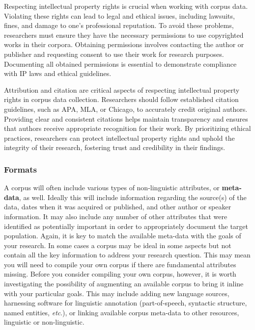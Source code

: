 \documentclass[
  letterpaper,
]{latex/krantz}
\begin{document}
Respecting intellectual property rights is crucial when working with
corpus data. Violating these rights can lead to legal and ethical
issues, including lawsuits, fines, and damage to one's professional
reputation. To avoid these problems, researchers must ensure they have
the necessary permissions to use copyrighted works in their corpora.
Obtaining permissions involves contacting the author or publisher and
requesting consent to use their work for research purposes. Documenting
all obtained permissions is essential to demonstrate compliance with IP
laws and ethical guidelines.

Attribution and citation are critical aspects of respecting intellectual
property rights in corpus data collection. Researchers should follow
established citation guidelines, such as APA, MLA, or Chicago, to
accurately credit original authors. Providing clear and consistent
citations helps maintain transparency and ensures that authors receive
appropriate recognition for their work. By prioritizing ethical
practices, researchers can protect intellectual property rights and
uphold the integrity of their research, fostering trust and credibility
in their findings.

\hypertarget{formats}{%
\subsubsection{Formats}\label{formats}}

A corpus will often include various types of non-linguistic attributes,
or \textbf{meta-data}, as well. Ideally this will
include information regarding the source(s) of the data, dates when it
was acquired or published, and other author or speaker information. It
may also include any number of other attributes that were identified as
potentially important in order to appropriately document the target
population. Again, it is key to match the available meta-data with the
goals of your research. In some cases a corpus may be ideal in some
aspects but not contain all the key information to address your research
question. This may mean you will need to compile your own corpus if
there are fundamental attributes missing. Before you consider compiling
your own corpus, however, it is worth investigating the possibility of
augmenting an available corpus to bring it inline with your particular
goals. This may include adding new language sources, harnessing software
for linguistic annotation (part-of-speech, syntactic structure, named
entities, \emph{etc}.), or linking available corpus meta-data to other
resources, linguistic or non-linguistic.
\end{document}
